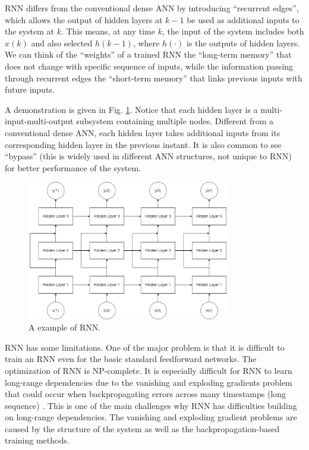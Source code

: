 RNN differs from the conventional dense ANN by introducing ``recurrent edges'', which allows the output of hidden layers at $k-1$ be used as additional inputs to the system at $k$. This means, at any time $k$, the input of the system includes both $x(k)$ and also selected $h(k-1)$, where $h(\cdot)$ is the outputs of hidden layers. We can think of the ``weights'' of a trained RNN the ``long-term memory'' that does not change with specific sequence of inputs, while the information passing through recurrent edges the ``short-term memory'' that links previous inputs with future inputs.

A demonstration is given in Fig. \ref{ch:transformerbasics:fig:rnn_general}. Notice that each hidden layer is a multi-input-multi-output subsystem containing multiple nodes. Different from a conventional dense ANN, each hidden layer takes additional inputs from its corresponding hidden layer in the previous instant. It is also common to see ``bypass'' (this is widely used in different ANN structures, not unique to RNN) for better performance of the system.

\begin{figure}
	\centering
	\includegraphics[width=250pt]{chapters/ch-transformer/figs/rnn_general.png}
	\caption{A example of RNN.} \label{ch:transformerbasics:fig:rnn_general}
\end{figure}

RNN has some limitations. One of the major problem is that it is difficult to train an RNN even for the basic standard feedforward networks. The optimization of RNN is NP-complete. It is especially difficult for RNN to learn long-range dependencies due to the vanishing and exploding gradients problem that could occur when backpropagating errors across many timestamps (long sequence) \cite{lipton2015critical}. This is one of the main challenges why RNN has difficulties building on long-range dependencies. The vanishing and exploding gradient problems are caused by the structure of the system as well as the backpropagation-based training methods.

